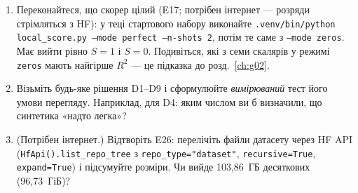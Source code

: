 \begin{practicum}
\begin{enumerate}
\item Переконайтеся, що скорер цілий (E17; потрібен інтернет --- розряди стрімляться з HF): у теці стартового набору виконайте
  \texttt{.venv/bin/python local\_score.py --mode perfect --n-shots 2}, потім те саме з
  \texttt{--mode zeros}. Має вийти рівно $S=1$ і $S=0$. Подивіться, які з семи скалярів
  у режимі \texttt{zeros} мають найгірше $R^2$ --- це підказка до розд.~\ref{ch:g02}.
\item Візьміть будь-яке рішення D1--D9 і сформулюйте \emph{вимірюваний} тест його умови
  перегляду. Наприклад, для D4: яким числом ви б визначили, що синтетика «надто легка»?
\item (Потрібен інтернет.) Відтворіть E26: перелічіть файли датасету через HF API
  (\texttt{HfApi().list\_repo\_tree} з \verb|repo_type="dataset"|, \texttt{recursive=True}, \texttt{expand=True}) і підсумуйте розміри.
  Чи вийде 103,86~ГБ десяткових (96,73~ГіБ)?
\end{enumerate}
\end{practicum}
